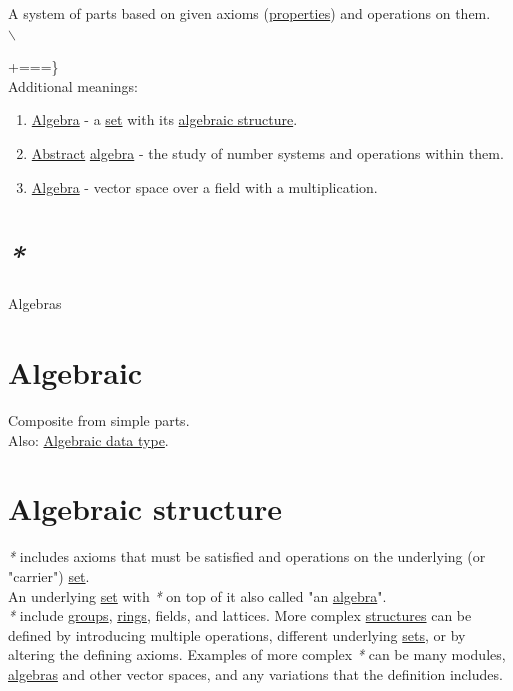 \documentclass[a4paper,14pt,oneside]{book}
\begin{document}
A system of parts based on given axioms (\hyperref[org5fc06ca]{properties}) and operations on them.\\


$\backslash${\footnotesize +===\}\\

Additional meanings:\\

\begin{enumerate}
\item \hyperref[org8f571f3]{Algebra} - a \hyperref[org0726f94]{set} with its \hyperref[org57a3d22]{algebraic structure}.\\
\item \hyperref[org3affb7d]{Abstract} \hyperref[org8f571f3]{algebra} - the study of number systems and operations within them.\\
\item \hyperref[org8f571f3]{Algebra} - vector space over a field with a multiplication.\\
\end{enumerate}

\section{\emph{*}}
\label{sec:org347f5d8}

\label{orga4fb878}Algebras\\

\section{\label{org312c3a4}Algebraic}
\label{sec:org599ec1a}
Composite from simple parts.\\

Also: \hyperref[org1ceda42]{Algebraic data type}.\\

\section{\label{org57a3d22}Algebraic structure}
\label{sec:org915e388}
\emph{*} includes axioms that must be satisfied and operations on the underlying (or "carrier") \hyperref[org0726f94]{set}.\\

An underlying \hyperref[org0726f94]{set} with \emph{*} on top of it also called "an \hyperref[org8f571f3]{algebra}".\\

\emph{*} include \hyperref[org70d86d2]{groups}, \hyperref[org465bd2d]{rings}, fields, and lattices. More complex \hyperref[org29bb033]{structures} can be defined by introducing multiple operations, different underlying \hyperref[org732f054]{sets}, or by altering the defining axioms. Examples of more complex \emph{*} can be many modules, \hyperref[orga4fb878]{algebras} and other vector spaces, and any variations that the definition includes.\\

}
\end{document}
